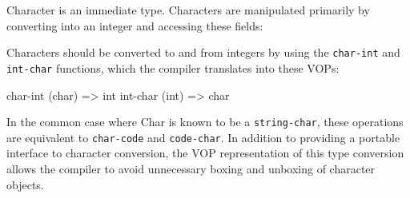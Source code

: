 Character is an immediate type.  Characters are manipulated primarily by
converting into an integer and accessing these fields:

Characters should be converted to and from integers by using the \clisp
{\tt char-int} and {\tt int-char} functions, which the compiler translates into
these VOPs:
\begin{example}
char-int (char) => int
int-char (int) => char
\end{example}
In the common case where Char is known to be a {\tt string-char}, these
operations are equivalent to {\tt char-code} and {\tt code-char}.  In addition to
providing a portable interface to character conversion, the VOP representation
of this type conversion allows the compiler to avoid unnecessary boxing and
unboxing of character objects.

